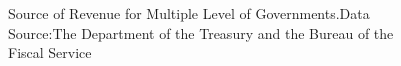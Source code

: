 \begin{figure}[H]
{\begin{minipage}{7cm}
    \end{minipage}
}
    \caption[Source of Revenue for Multiple Level of Governments in 2019]{Source of Revenue for Multiple Level of Governments.Data Source:The Department of the Treasury and the Bureau of the Fiscal Service }    %
    \label{Figure 1.2}    %
    \end{figure}
   


